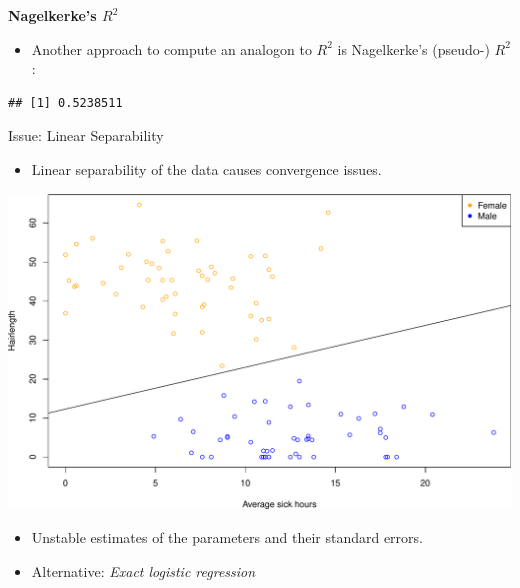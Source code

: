 \documentclass[
  ignorenonframetext,
]{beamer}
\newenvironment{Shaded}{\begin{snugshade}}{\end{snugshade}}
\newcommand{\DataTypeTok}[1]{\textcolor[rgb]{0.13,0.29,0.53}{#1}}
\newcommand{\DecValTok}[1]{\textcolor[rgb]{0.00,0.00,0.81}{#1}}
\newcommand{\KeywordTok}[1]{\textcolor[rgb]{0.13,0.29,0.53}{\textbf{#1}}}
\newcommand{\NormalTok}[1]{#1}
\newcommand{\OperatorTok}[1]{\textcolor[rgb]{0.81,0.36,0.00}{\textbf{#1}}}
\newcommand{\StringTok}[1]{\textcolor[rgb]{0.31,0.60,0.02}{#1}}
\providecommand{\tightlist}{%
  \setlength{\itemsep}{0pt}\setlength{\parskip}{0pt}}
\begin{document}
\begin{frame}[fragile]

\textbf{Nagelkerke's \(R^2\)}

\begin{itemize}
\tightlist
\item
  Another approach to compute an analogon to \(R^2\) is Nagelkerke's
  (pseudo-) \(R^2\):
\end{itemize}

\tiny

\begin{Shaded}
\end{Shaded}

\begin{verbatim}
## [1] 0.5238511
\end{verbatim}

\normalsize

\end{frame}

\begin{frame}{Issue: Linear Separability}
\protect\hypertarget{issue-linear-separability}{}

\begin{itemize}
\tightlist
\item
  Linear separability of the data causes convergence issues.
\end{itemize}

\tiny

\includegraphics[width=0.5\linewidth,height=0.5\textheight]{Schmitt_Marvin_binary_response_files/figure-beamer/unnamed-chunk-22-1}
\normalsize

\begin{itemize}
\tightlist
\item
  Unstable estimates of the parameters and their standard errors.
\item
  Alternative: \emph{Exact logistic regression}
\end{itemize}

\end{frame}
\end{document}
